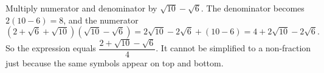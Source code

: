 Multiply numerator and denominator by $\sqrt{10}-\sqrt6$. The denominator becomes $2(10-6)=8$, and the numerator
\[
(2+\sqrt6+\sqrt{10})(\sqrt{10}-\sqrt6)=2\sqrt{10}-2\sqrt6+(10-6)=4+2\sqrt{10}-2\sqrt6 .
\]
So the expression equals $\boxed{\dfrac{2+\sqrt{10}-\sqrt6}{4}}$. It cannot be simplified to a non-fraction just because the same symbols appear on top and bottom.
